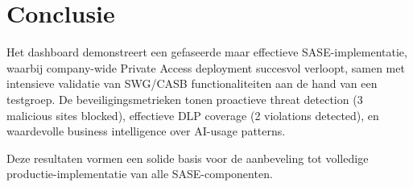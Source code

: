 \section{Conclusie}
Het dashboard demonstreert een gefaseerde maar effectieve SASE-implementatie, waarbij company-wide Private Access deployment succesvol verloopt, samen met intensieve validatie van SWG/CASB functionaliteiten aan de hand van een testgroep. De beveiligingsmetrieken tonen proactieve threat detection (3 malicious sites blocked), effectieve DLP coverage (2 violations detected), en waardevolle business intelligence over AI-usage patterns.

\vspace{2ex}

Deze resultaten vormen een solide basis voor de aanbeveling tot volledige productie-implementatie van alle SASE-componenten.
